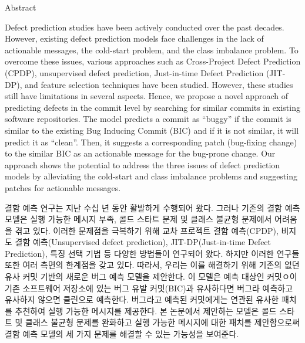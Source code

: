 
\newcommand{\abstractEN}[1]{\normalsize #1 \par}
\newcommand{\abstractKR}[1]{\normalsize #1 \par}

\fontsize{14}{18} \selectfont Abstract \par
{}

\bigskip
\abstractEN{
    Defect prediction studies have been actively conducted over the past decades.
    However, existing defect prediction models face challenges in the lack of actionable messages, the cold-start problem, and the class imbalance problem.
    To overcome these issues, various approaches such as Cross-Project Defect Prediction (CPDP), unsupervised defect prediction, Just-in-time Defect Prediction (JIT-DP), and feature selection techniques have been studied.
    However, these studies still have limitations in several aspects.
    Hence, we propose a novel approach of predicting defects in the commit level by searching for similar commits in existing software repositories.
    The model predicts a commit as “buggy” if the commit is similar to the existing Bug Inducing Commit (BIC) and if it is not similar, it will predict it as “clean”.
    Then, it suggests a corresponding patch (bug-fixing change) to the similar BIC as an actionable message for the bug-prone change.
    Our approach shows the potential to address the three issues of defect prediction models by alleviating the cold-start and class imbalance problems and suggesting patches for actionable messages.
}
\bigskip
\bigskip
\abstractKR{
    결함 예측 연구는 지난 수십 년 동안 활발하게 수행되어 왔다.
    그러나 기존의 결함 예측 모델은 실행 가능한 메시지 부족, 콜드 스타트 문제 및 클래스 불균형 문제에서 어려움을 겪고 있다.
    이러한 문제점을 극복하기 위해 교차 프로젝트 결함 예측(CPDP), 비지도 결함 예측(Unsupervised defect prediction), JIT-DP(Just-in-time Defect Prediction), 특징 선택 기법 등 다양한 방법들이 연구되어 왔다.
    하지만 이러한 연구들 또한 여러 측면의 한계점을 갖고 있다.
    따라서, 우리는 이를 해결하기 위해 기존의 없던 유사 커밋 기반의 새로운 버그 예측 모델을 제안한다.
    이 모델은 예측 대상인 커밋ㅇ이 기존 소프트웨어 저장소에 있는 버그 유발 커밋(BIC)과 유사하다면 버그라 예측하고 유사하지 않으면 클린으로 예측한다.
    버그라고 예측된 커밋에게는 연관된 유사한 패치를 추천하여 실행 가능한 메시지를 제공한다.
    본 논문에서 제안하는 모델은 콜드 스타트 및 클래스 불균형 문제를 완화하고 실행 가능한 메시지에 대한 패치를 제안함으로써 결함 예측 모델의 세 가지 문제를 해결할 수 있는 가능성을 보여준다.
}

\clearpage
